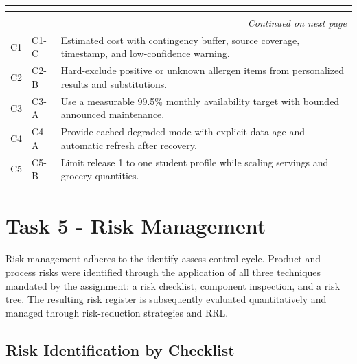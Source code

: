 \documentclass[11pt,a4paper]{article}
\renewcommand{\arraystretch}{1.15}
\begin{document}
\begin{center}
\small
\setlength{\tabcolsep}{2.5pt}
\renewcommand{\arraystretch}{1.18}
\begin{longtable}{|p{2.2cm}|p{2.5cm}|p{11.2cm}|}
\hline
\rowcolor{headerblue} \textbf{\color{white}{Conflict}} & \textbf{\color{white}{Selected option}} & \textbf{\color{white}{Decision}} \\ \hline
\endfirsthead
\hline
\rowcolor{headerblue} \textbf{\color{white}{Conflict}} & \textbf{\color{white}{Selected option}} & \textbf{\color{white}{Decision}} \\ \hline
\endhead
\hline
\multicolumn{3}{r}{\small\itshape Continued on next page}\\
\endfoot
\hline
\endlastfoot
C1 & C1-C & Estimated cost with contingency buffer, source coverage, timestamp, and low-confidence warning. \\ \hline
C2 & C2-B & Hard-exclude positive or unknown allergen items from personalized results and substitutions. \\ \hline
C3 & C3-A & Use a measurable 99.5\% monthly availability target with bounded announced maintenance. \\ \hline
C4 & C4-A & Provide cached degraded mode with explicit data age and automatic refresh after recovery. \\ \hline
C5 & C5-B & Limit release 1 to one student profile while scaling servings and grocery quantities. \\ \hline
\end{longtable}
\end{center}

\section{Task 5 - Risk Management}

Risk management adheres to the identify-assess-control cycle. Product and process risks were identified through the application of all three techniques mandated by the assignment: a risk checklist, component inspection, and a risk tree. The resulting risk register is subsequently evaluated quantitatively and managed through risk-reduction strategies and RRL.

\subsection{Risk Identification by Checklist}
\end{document}
